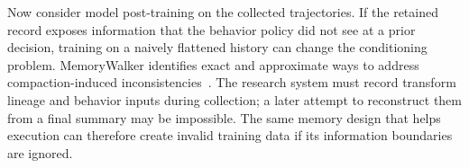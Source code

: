 Now consider model post-training on the collected trajectories. If the retained record exposes information that the behavior policy did not see at a prior decision, training on a naively flattened history can change the conditioning problem. MemoryWalker identifies exact and approximate ways to address compaction-induced inconsistencies~\cite{j2026memorywalker}. The research system must record transform lineage and behavior inputs during collection; a later attempt to reconstruct them from a final summary may be impossible. The same memory design that helps execution can therefore create invalid training data if its information boundaries are ignored.

